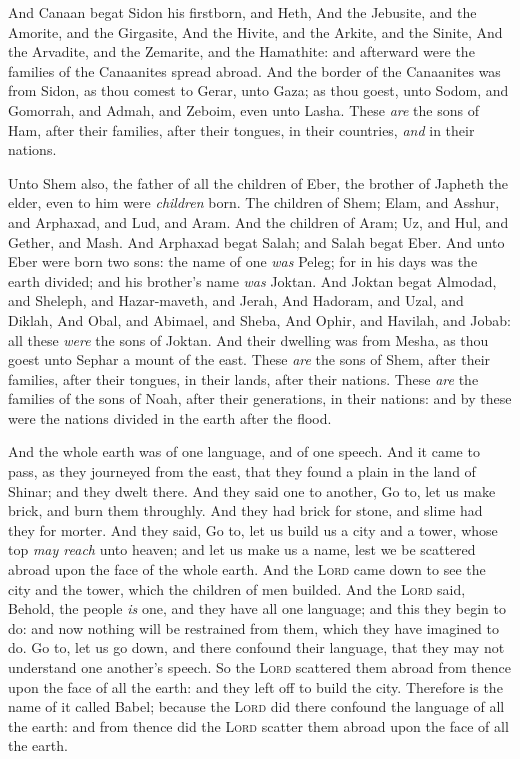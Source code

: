 \documentclass[11pt,letterpaper,oneside]{memoir}
\begin{document}
And Canaan begat Sidon his firstborn, and Heth, And the Jebusite, and
the Amorite, and the Girgasite, And the Hivite, and the Arkite, and the
Sinite, And the Arvadite, and the Zemarite, and the Hamathite: and
afterward were the families of the Canaanites spread abroad. And the
border of the Canaanites was from Sidon, as thou comest to Gerar, unto
Gaza; as thou goest, unto Sodom, and Gomorrah, and Admah, and Zeboim,
even unto Lasha. These \emph{are} the sons of Ham, after their families,
after their tongues, in their countries, \emph{and} in their nations.

Unto Shem also, the father of all the children of Eber, the brother of
Japheth the elder, even to him were \emph{children} born. The children
of Shem; Elam, and Asshur, and Arphaxad, and Lud, and Aram. And the
children of Aram; Uz, and Hul, and Gether, and Mash. And Arphaxad begat
Salah; and Salah begat Eber. And unto Eber were born two sons: the name
of one \emph{was} Peleg; for in his days was the earth divided; and his
brother's name \emph{was} Joktan. And Joktan begat Almodad, and Sheleph,
and Hazar-maveth, and Jerah, And Hadoram, and Uzal, and Diklah, And
Obal, and Abimael, and Sheba, And Ophir, and Havilah, and Jobab: all
these \emph{were} the sons of Joktan. And their dwelling was from Mesha,
as thou goest unto Sephar a mount of the east. These \emph{are} the sons
of Shem, after their families, after their tongues, in their lands,
after their nations. These \emph{are} the families of the sons of Noah,
after their generations, in their nations: and by these were the nations
divided in the earth after the flood.

And the whole earth was of one language, and of one speech. And it came
to pass, as they journeyed from the east, that they found a plain in the
land of Shinar; and they dwelt there. And they said one to another, Go
to, let us make brick, and burn them throughly. And they had brick for
stone, and slime had they for morter. And they said, Go to, let us build
us a city and a tower, whose top \emph{may reach} unto heaven; and let
us make us a name, lest we be scattered abroad upon the face of the
whole earth. And the \textsc{Lord} came down to see the city and the
tower, which the children of men builded. And the \textsc{Lord} said,
Behold, the people \emph{is} one, and they have all one language; and
this they begin to do: and now nothing will be restrained from them,
which they have imagined to do. Go to, let us go down, and there
confound their language, that they may not understand one another's
speech. So the \textsc{Lord} scattered them abroad from thence upon the
face of all the earth: and they left off to build the city. Therefore is
the name of it called Babel; because the \textsc{Lord} did there confound
the language of all the earth: and from thence did the \textsc{Lord}
scatter them abroad upon the face of all the earth.
\end{document}
